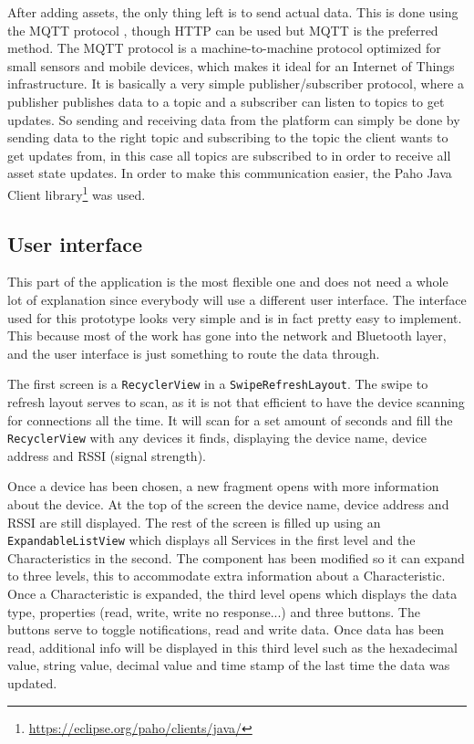 \documentclass[pdftex,a4paper,12pt,twoside]{report}
\begin{document}
After adding assets, the only thing left is to send actual data. This is done using the MQTT protocol \citep{waher2015learning}, though HTTP can be used but MQTT is the preferred method. The MQTT protocol is a machine-to-machine protocol optimized for small sensors and mobile devices, which makes it ideal for an Internet of Things infrastructure. It is basically a very simple publisher/subscriber protocol, where a publisher publishes data to a topic and a subscriber can listen to topics to get updates. So sending and receiving data from the platform can simply be done by sending data to the right topic and subscribing to the topic the client wants to get updates from, in this case all topics are subscribed to in order to receive all asset state updates. In order to make this communication easier, the Paho Java Client library\footnote{\url{https://eclipse.org/paho/clients/java/}} was used.

\subsection{User interface}
\label{subsec:userinterface}
This part of the application is the most flexible one and does not need a whole lot of explanation since everybody will use a different user interface. The interface used for this prototype looks very simple and is in fact pretty easy to implement. This because most of the work has gone into the network and Bluetooth layer, and the user interface is just something to route the data through.

The first screen is a \texttt{RecyclerView} in a \texttt{SwipeRefreshLayout}. The swipe to refresh layout serves to scan, as it is not that efficient to have the device scanning for connections all the time. It will scan for a set amount of seconds and fill the \texttt{RecyclerView} with any devices it finds, displaying the device name, device address and RSSI (signal strength).

Once a device has been chosen, a new fragment opens with more information about the device. At the top of the screen the device name, device address and RSSI are still displayed. The rest of the screen is filled up using an \texttt{ExpandableListView} which displays all Services in the first level and the Characteristics in the second. The component has been modified so it can expand to three levels, this to accommodate extra information about a Characteristic. Once a Characteristic is expanded, the third level opens which displays the data type, properties (read, write, write no response...) and three buttons. The buttons serve to toggle notifications, read and write data. Once data has been read, additional info will be displayed in this third level such as the hexadecimal value, string value, decimal value and time stamp of the last time the data was updated.
\end{document}

